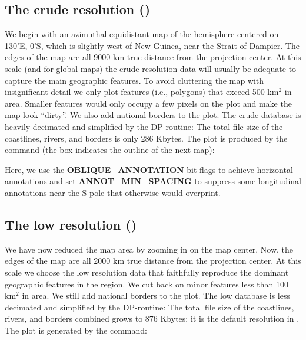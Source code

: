 
\subsection{The crude resolution ()} 

We begin with an azimuthal equidistant map of the hemisphere
centered on 130'E, 0'S, which is slightly west
of New Guinea, near the Strait of Dampier.  The edges of the
map are all 9000 km true distance from the projection center.
At this scale (and for global maps) the crude resolution data
will usually be adequate to capture the main geographic features.
To avoid cluttering the map with insignificant detail we only
plot features (i.e., polygons) that exceed 500 km$^2$ in area.
Smaller features would only occupy a few pixels on the plot and
make the map look ``dirty''.  We also add national borders to
the plot.  The crude database is heavily decimated and simplified
by the DP-routine: The total file size of the coastlines, rivers,
and borders is only 286 Kbytes.  The plot is produced by the
command (the box indicates the outline of the next map):



Here, we use the {\bf OBLIQUE\_ANNOTATION} bit flags to achieve
horizontal annotations and set {\bf ANNOT\_MIN\_SPACING} to suppress some longitudinal
annotations near the S pole that otherwise would overprint.


\subsection{The low resolution ()} 

We have now reduced the map area by zooming in on the map center.
Now, the edges of the map are all 2000 km true distance from
the projection center.  At this scale we choose the low resolution
data that faithfully reproduce the dominant geographic features
in the region.  We cut back on minor features less than 100 km$^2$
in area.  We still add national borders to the plot.  The low
database is less decimated and simplified by the DP-routine: The
total file size of the coastlines, rivers, and borders combined
grows to 876 Kbytes; it is the default resolution in \GMT.  The
plot is generated by the command:

